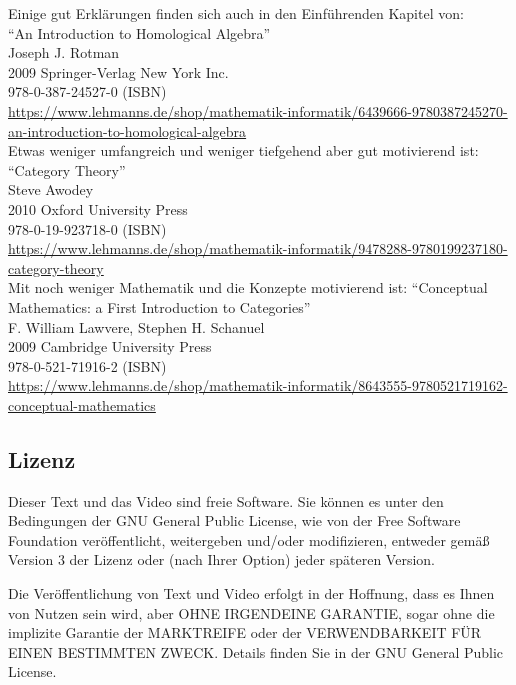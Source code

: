 \documentclass[a4paper]{amsart}
\theoremstyle{definition}
\begin{document}
Einige gut Erklärungen finden sich auch in den Einführenden Kapitel von:\\
"`An Introduction to Homological Algebra"'\\
Joseph J. Rotman\\
2009 Springer-Verlag New York Inc.\\
978-0-387-24527-0 (ISBN)\\ 
{\tiny \url{https://www.lehmanns.de/shop/mathematik-informatik/6439666-9780387245270-an-introduction-to-homological-algebra}}\\

Etwas weniger umfangreich und weniger tiefgehend aber gut motivierend ist:
"`Category Theory"'\\
Steve Awodey\\
2010 Oxford University Press\\
978-0-19-923718-0 (ISBN)\\
{\tiny\url{https://www.lehmanns.de/shop/mathematik-informatik/9478288-9780199237180-category-theory}}\\

Mit noch weniger Mathematik und die Konzepte motivierend ist:
"`Conceptual Mathematics: a First Introduction to Categories"'\\
F. William Lawvere, Stephen H. Schanuel\\
2009 Cambridge University Press\\
978-0-521-71916-2 (ISBN)\\
{\tiny\url{https://www.lehmanns.de/shop/mathematik-informatik/8643555-9780521719162-conceptual-mathematics}}

\subsection*{Lizenz}
Dieser Text und das Video sind freie Software. Sie können es unter den Bedingungen der 
GNU General Public License, wie von der Free Software Foundation veröffentlicht, weitergeben 
und/oder modifizieren, entweder gemäß Version 3 der Lizenz oder (nach Ihrer Option) jeder späteren Version.

Die Veröffentlichung von Text und Video erfolgt in der Hoffnung, dass es Ihnen von Nutzen sein wird, 
aber OHNE IRGENDEINE GARANTIE, sogar ohne die implizite Garantie der MARKTREIFE oder der 
VERWENDBARKEIT FÜR EINEN BESTIMMTEN ZWECK. Details finden Sie in der GNU General Public License.
\end{document}
